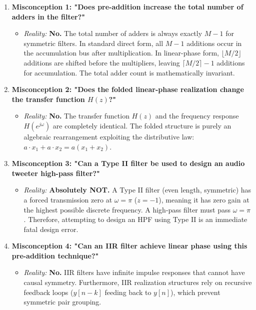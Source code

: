 \documentclass[11pt,a4paper]{article}
\begin{document}
\begin{enumerate}
    \item \textbf{Misconception 1: "Does pre-addition increase the total number of adders in the filter?"}
    \begin{itemize}
        \item \textit{Reality:} \textbf{No.} The total number of adders is always exactly $M-1$ for symmetric filters. In standard direct form, all $M-1$ additions occur in the accumulation bus after multiplication. In linear-phase form, $\lfloor M/2 \rfloor$ additions are shifted before the multipliers, leaving $\lceil M/2 \rceil - 1$ additions for accumulation. The total adder count is mathematically invariant.
    \end{itemize}

    \item \textbf{Misconception 2: "Does the folded linear-phase realization change the transfer function $H(z)$?"}
    \begin{itemize}
        \item \textit{Reality:} \textbf{No.} The transfer function $H(z)$ and the frequency response $H(e^{j\omega})$ are completely identical. The folded structure is purely an algebraic rearrangement exploiting the distributive law: $a \cdot x_1 + a \cdot x_2 = a(x_1 + x_2)$.
    \end{itemize}

    \item \textbf{Misconception 3: "Can a Type II filter be used to design an audio tweeter high-pass filter?"}
    \begin{itemize}
        \item \textit{Reality:} \textbf{Absolutely NOT.} A Type II filter (even length, symmetric) has a forced transmission zero at $\omega = \pi$ ($z = -1$), meaning it has zero gain at the highest possible discrete frequency. A high-pass filter must pass $\omega = \pi$. Therefore, attempting to design an HPF using Type II is an immediate fatal design error.
    \end{itemize}

    \item \textbf{Misconception 4: "Can an IIR filter achieve linear phase using this pre-addition technique?"}
    \begin{itemize}
        \item \textit{Reality:} \textbf{No.} IIR filters have infinite impulse responses that cannot have causal symmetry. Furthermore, IIR realization structures rely on recursive feedback loops ($y[n-k]$ feeding back to $y[n]$), which prevent symmetric pair grouping.
    \end{itemize}
\end{enumerate}
\end{document}
